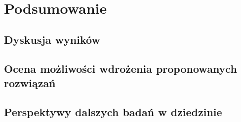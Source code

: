 \chapter{Podsumowanie}
\section{Dyskusja wyników}
\section{Ocena możliwości wdrożenia proponowanych rozwiązań}
\section{Perspektywy dalszych badań w dziedzinie}


\listoffigures

\listoftables

